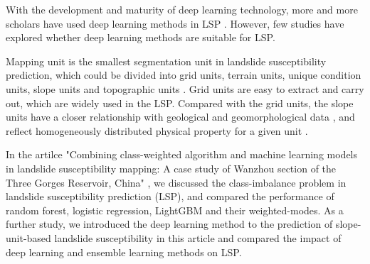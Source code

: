 \documentclass[a4paper,fleqn]{cas-sc}
\begin{document}
With the development and maturity of deep learning technology, more and more scholars have used deep learning methods in LSP \citep{Prakash2020, Ngo2021, Nhu2020, Dao2020, Ghorbanzadeh2019RemoteSensing, Bui2020Catena}.
However, few studies have explored whether deep learning methods are suitable for LSP.

Mapping unit is the smallest segmentation unit in landslide susceptibility prediction, which could be divided into grid units, terrain units, unique condition units, slope units and topographic units \citep{Zhao2021}.
Grid units are easy to extract and carry out, which are widely used in the LSP. 
Compared with the grid units, the slope units have a closer relationship with geological and geomorphological data \citep{Guzzetti_1999_Geomorphology,Zhao2021}, and reflect homogeneously distributed physical property for a given unit \citep{Tanyas2019} . 

In the artilce "Combining class-weighted algorithm and machine learning models in landslide susceptibility mapping: A case study of Wanzhou section of the Three Gorges Reservoir, China" \citep{Zhang2022}, we discussed the class-imbalance problem in landslide susceptibility prediction (LSP), and compared the performance of random forest, logistic regression, LightGBM and their weighted-modes. 
As a further study, we introduced the deep learning method to the prediction of slope-unit-based landslide susceptibility in this article and compared the impact of deep learning and ensemble learning methods on LSP.
\end{document}
